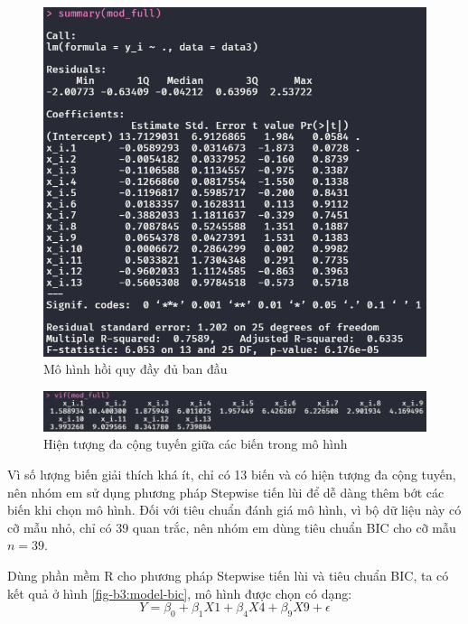 \begin{figure}[H]
	\centering
	\includegraphics[width=0.7\linewidth]{images/B3/model-full}
	\caption{Mô hình hồi quy đầy đủ ban đầu}
	\label{fig-b3:model-full}
\end{figure}

\begin{figure}[H]
	\centering
	\includegraphics[width=0.7\linewidth]{images/B3/model-full-vif}
	\caption{Hiện tượng đa cộng tuyến giữa các biến trong mô hình}
	\label{fig-b3:model-full-vif}
\end{figure}

Vì số lượng biến giải thích khá ít, chỉ có 13 biến và có hiện tượng đa cộng tuyến, nên nhóm em sử dụng phương pháp Stepwise tiến lùi để dễ dàng thêm bớt các biến khi chọn mô hình. Đối với tiêu chuẩn đánh giá mô hình, vì bộ dữ liệu này có cỡ mẫu nhỏ, chỉ có 39 quan trắc, nên nhóm em dùng tiêu chuẩn BIC cho cỡ mẫu $n=39$.

Dùng phần mềm R cho phương pháp Stepwise tiến lùi và tiêu chuẩn BIC, ta có kết quả ở hình \ref{fig-b3:model-bic}, mô hình được chọn có dạng:
\begin{equation}\label{b3-model-bic}
	Y = \beta_0 + \beta_1X1 + \beta_4X4 + \beta_9X9 + \epsilon
\end{equation}

